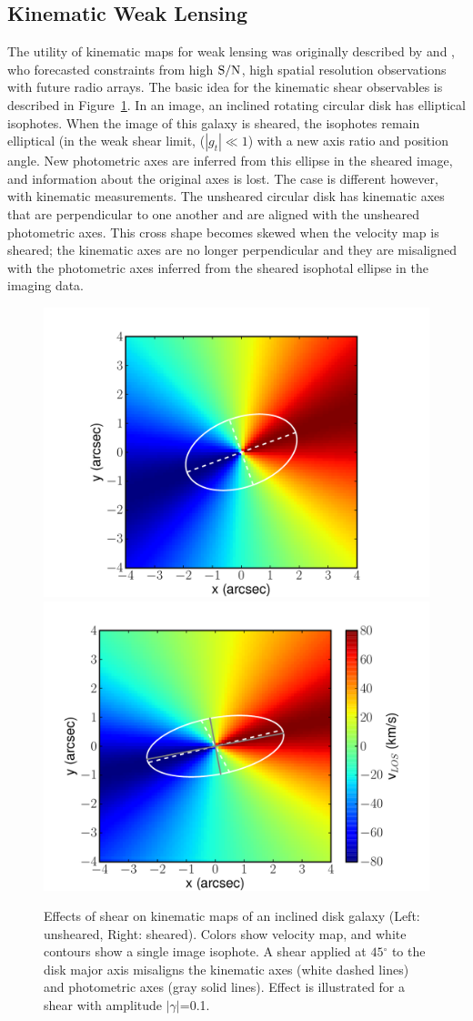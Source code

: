 \documentclass[12pt]{article}
\newcommand{\degr}{\ensuremath{^\circ}}
\begin{document}
\subsection{Kinematic Weak Lensing}

The utility of kinematic maps for weak lensing was originally described by \citet{Blain2002} and \citet{Morales2006}, who forecasted constraints from high ${\rm S/N}$, high spatial resolution observations with future radio arrays. The basic idea for the kinematic shear observables is described in Figure~\ref{fig:vmaps}. In an image, an inclined rotating circular disk has elliptical isophotes. When the image of this galaxy is sheared, the isophotes remain elliptical (in the weak shear limit, ($|g_t|\ll1$) with a new axis ratio and position angle. New photometric axes are inferred from this ellipse in the sheared image, and information about the original axes is lost. The case is different however, with kinematic measurements. The unsheared circular disk has kinematic axes that are perpendicular to one another and are aligned with the unsheared photometric axes. This cross shape becomes skewed when the velocity map is sheared; the kinematic axes are no longer perpendicular and they are misaligned with the photometric axes inferred from the sheared isophotal ellipse in the imaging data.

\begin{figure}[t]
\begin{center}
\includegraphics[width=0.45\linewidth]{Plots/fig1a.pdf}
\includegraphics[width=0.45\linewidth]{Plots/fig1b.pdf}
\caption{Effects of shear on kinematic maps of an inclined disk galaxy (Left: unsheared, Right: sheared). Colors show velocity map, and white contours show a single image isophote. A shear applied at $45\degr$ to the disk major axis misaligns the kinematic axes (white dashed lines) and photometric axes (gray solid lines). Effect is illustrated for a shear with amplitude $|\gamma|$=0.1.}
\label{fig:vmaps}
\end{center}
\end{figure}
\end{document}
